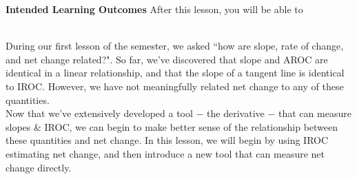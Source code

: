 \documentclass[10pt]{article}
\begin{document}
\pagestyle{otherpages}
\thispagestyle{firstpage}

\textbf{Intended Learning Outcomes}
After this lesson, you will be able to 


\vspace{-0.25cm}

\hrulefill\\

During our first lesson of the semester, we asked ``how are slope, rate of change, and net change related?". So far, we've discovered that slope and AROC are identical in a linear relationship, and that the slope of a tangent line is identical to IROC. However, we have not meaningfully related net change to any of these quantities.\\

Now that we've extensively developed a tool $-$ the derivative $-$ that can measure slopes \& IROC, we can begin to make better sense of the relationship between these quantities and net change. In this lesson, we will begin by using IROC estimating net change, and then introduce a new tool that can measure net change directly.\\
\end{document}
